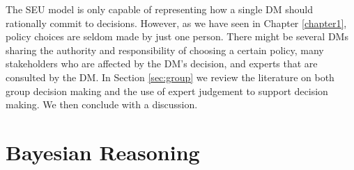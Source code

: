 The \gls{SEU} model is only capable of representing how a single \gls{DM} should rationally commit to decisions. However, as we have seen in Chapter \ref{chapter1}, policy choices are seldom made by just one person. There might be several \glspl{DM} sharing the authority and responsibility of choosing a certain policy, many stakeholders who are affected by the \gls{DM}'s decision, and experts that are consulted by the \gls{DM}. In Section \ref{sec:group} we review the literature on both group decision making and the use of expert judgement to support decision making. We then conclude with a discussion.

\section{Bayesian Reasoning}
\label{sec:bayesianreasoning}
